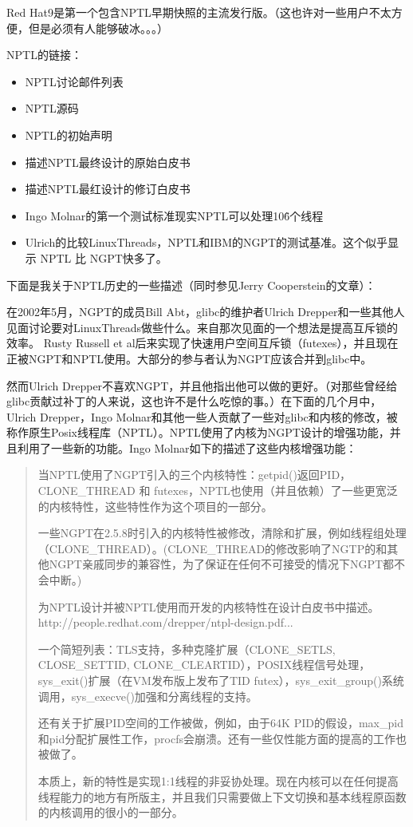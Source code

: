 \documentclass[twoside, xetex]{report}
\begin{document}
	Red Hat9是第一个包含NPTL早期快照的主流发行版。（这也许对一些用户不太方便，但是必须有人能够破冰。。。）

	NPTL的链接：
	\begin{itemize}
		\item NPTL讨论邮件列表
		\item NPTL源码
		\item NPTL的初始声明
		\item 描述NPTL最终设计的原始白皮书
		\item 描述NPTL最红设计的修订白皮书
		\item Ingo Molnar的第一个测试标准现实NPTL可以处理10\^6个线程
		\item Ulrich的比较LinuxThreads，NPTL和IBM的NGPT的测试基准。这个似乎显示 NPTL 比 NGPT快多了。
	\end{itemize}

	下面是我关于NPTL历史的一些描述（同时参见Jerry Cooperstein的文章）：

	在2002年5月，NGPT的成员Bill Abt，glibc的维护者Ulrich Drepper和一些其他人见面讨论要对LinuxThreads做些什么。来自那次见面的一个想法是提高互斥锁的效率。 Rusty Russell et al后来实现了快速用户空间互斥锁（futexes），并且现在正被NGPT和NPTL使用。大部分的参与者认为NGPT应该合并到glibc中。

	然而Ulrich Drepper不喜欢NGPT，并且他指出他可以做的更好。（对那些曾经给\\glibc贡献过补丁的人来说，这也许不是什么吃惊的事。）在下面的几个月中，Ulrich Drepper，Ingo Molnar和其他一些人贡献了一些对glibc和内核的修改，被称作原生Posix线程库（NPTL）。NPTL使用了内核为NGPT设计的增强功能，并且利用了一些新的功能。Ingo Molnar如下的描述了这些内核增强功能：

	\begin{quotation}
		当NPTL使用了NGPT引入的三个内核特性：getpid()返回PID，\\ CLONE\_THREAD 和 futexes，NPTL也使用（并且依赖）了一些更宽泛的内核特性，这些特性作为这个项目的一部分。

		一些NGPT在2.5.8时引入的内核特性被修改，清除和扩展，例如线程组处理（CLONE\_THREAD）。(CLONE\_THREAD的修改影响了NGTP的和其他NGPT亲戚同步的兼容性，为了保证在任何不可接受的情况下NGPT都不会中断。)
		
		为NPTL设计并被NPTL使用而开发的内核特性在设计白皮书中描述。http://people.redhat.com/drepper/ntpl-design.pdf...

		一个简短列表：TLS支持，多种克隆扩展（CLONE\_SETLS, CLOSE\_SETTID, CLONE\_CLEARTID），POSIX线程信号处理， \\sys\_exit()扩展（在VM发布版上发布了TID futex），sys\_exit\_group()系统调用，sys\_execve()加强和分离线程的支持。

		还有关于扩展PID空间的工作被做，例如，由于64K PID的假设，max\_pid和pid分配扩展性工作，procfs会崩溃。还有一些仅性能方面的提高的工作也被做了。

		本质上，新的特性是实现1:1线程的非妥协处理。现在内核可以在任何提高线程能力的地方有所版主，并且我们只需要做上下文切换和基本线程原函数的内核调用的很小的一部分。
	\end{quotation}
\end{document}
